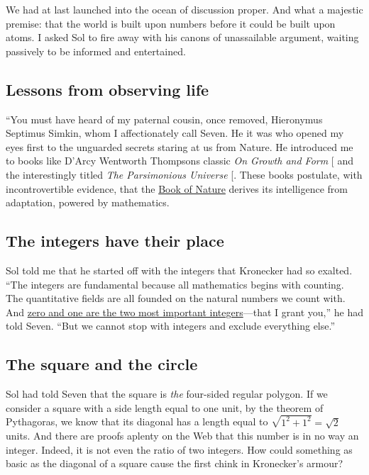 \documentclass[
  a4paper,
]{article}
\begin{document}
We had at last launched into the ocean of discussion proper. And what a
majestic premise: that the world is built upon numbers before it could
be built upon atoms. I asked Sol to fire away with his canons of
unassailable argument, waiting passively to be informed and entertained.

\subsection{Lessons from observing
life}\label{lessons-from-observing-life}

``You must have heard of my paternal cousin, once removed, Hieronymus
Septimus Simkin, whom I affectionately call Seven. He it was who opened
my eyes first to the unguarded secrets staring at us from Nature. He
introduced me to books like D'Arcy Wentworth Thompsons classic \emph{On
Growth and Form} {[}\citeproc{ref-thompson-1992}{1}{]} and the
interestingly titled \emph{The Parsimonious Universe}
{[}\citeproc{ref-parsimonious-1996}{2}{]}. These books postulate, with
incontrovertible evidence, that the \href{}{Book of Nature} derives its
intelligence from adaptation, powered by mathematics.

\subsection{The integers have their
place}\label{the-integers-have-their-place}

Sol told me that he started off with the integers that Kronecker had so
exalted. ``The integers are fundamental because all mathematics begins
with counting. The quantitative fields are all founded on the natural
numbers we count with. And
\href{https://swanlotus.netlify.app/blogs/the-two-most-important-numbers-zero-and-one}{zero
and one are the two most important integers}---that I grant you,'' he
had told Seven. ``But we cannot stop with integers and exclude
everything else.''

\subsection{The square and the circle}\label{the-square-and-the-circle}

Sol had told Seven that the square is \emph{the} four-sided regular
polygon. If we consider a square with a side length equal to one unit,
by the theorem of Pythagoras, we know that its diagonal has a length
equal to \(\sqrt{1^2 + 1^2} = \sqrt{2}\) units. And there are proofs
aplenty on the Web that this number is in no way an integer. Indeed, it
is not even the ratio of two integers. How could something as basic as
the diagonal of a square cause the first chink in Kronecker's armour?
\end{document}
